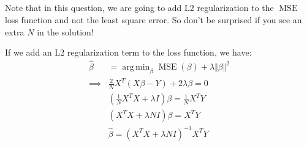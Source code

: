 \documentclass[]{article}
\numberwithin{equation}{section}
\newcommand{\norm}[2][]{\Vert #2\Vert_{#1}}
\newcommand{\transpose}{^T}
\DeclareMathOperator*{\argmin}{arg\,min}
\DeclareMathOperator*{\MSE}{MSE}
\begin{document}
\subsection{}
Note that in this question, we are going to add L2 regularization to the \(\MSE\) loss function and not the least square error.
So don't be surprised if you see an extra \(N\) in the solution!

If we add an L2 regularization term to the loss function, we have:
\begin{align}
\hat{\beta} &= \argmin_\beta \MSE(\beta) + \lambda \norm{\beta}^2\\
\implies & \frac{2}{N} X\transpose (X\beta - Y) + 2\lambda \beta = 0 \\
& (\frac{1}{N} X\transpose X + \lambda I) \beta = \frac{1}{N} X\transpose Y \\
& (X\transpose X + \lambda N I) \beta = X\transpose Y \\
& \hat{\beta} = (X\transpose X + \lambda N I)^{-1} X\transpose Y
\end{align}
\end{document}
